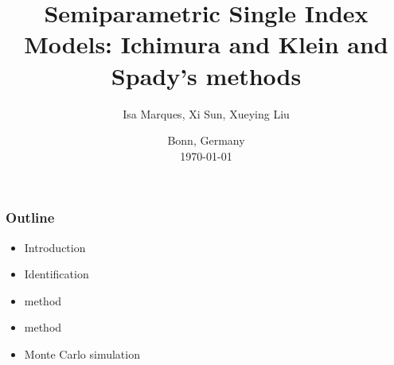 \documentclass{beamer}
\title[Ichimura's and Klein and Spady's methods]{Semiparametric Single Index Models: Ichimura and Klein and Spady's methods} %
\begin{document}
\author{Isa Marques, Xi Sun, Xueying Liu} %
{
}

\date{
{\small Bonn, Germany}\\
{\small \today}
}

\begin{frame}
\titlepage %
\end{frame}





\begin{frame}[t]
    \frametitle{Outline}
    
    \begin{itemize}
        \item Introduction
        \item Identification
        \item \citet{Ichimura93} method
        \item \citet{KleinSpady93} method
        \item Monte Carlo simulation
    \end{itemize}
    \note{~}
\end{frame}
\end{document}

